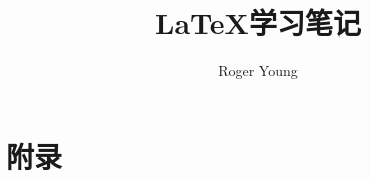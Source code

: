 \documentclass{ctexbook}
\newcommand{\documentTitle}
    {\texorpdfstring{\LaTeX 学习笔记}{LaTeX 学习笔记}}
\newcommand{\documentAuthor}{Roger Young}
\begin{document}
\title{\documentTitle}
\author{\documentAuthor}

\maketitle
\tableofcontents







\part{附录}


\printindex
\printglossaries
\end{document}
